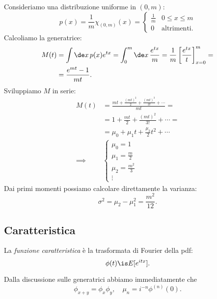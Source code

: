 \begin{example}
	Consideriamo una distribuzione uniforme in $(0,m)$:
	\begin{equation*}
		p(x) = \frac1m \chi_{(0,m)}(x) = \begin{cases}
			\frac 1m & 0 \le x \le m \\
			0  & \text{altrimenti.}
		\end{cases}
	\end{equation*}
	Calcoliamo la generatrice:
	\begin{align*}
		M(t) &= 
		\int \de x\, p(x) e^{tx} =
		\int_0^m \de x\, \frac{e^{tx}}{m} =
		\frac 1m \left[ \frac{e^{tx}}{t} \right]_{x=0}^m = \\
		&= \frac{e^{mt} - 1}{mt}.
	\end{align*}
	Sviluppiamo $M$ in serie:
	\begin{align*}
		M(t) &=
		\frac{mt + \frac{(mt)^2}2 + \frac{(mt)^3}{3!} + \dotsb}{mt} = \\
		&= 1 + \frac{mt}2 + \frac{(mt)^2}{3!} + \dotsb = \\
		&= \mu_0 + \mu_1t + \frac{\mu_2}2t^2 + \dotsb  \\
		\implies &\begin{cases}
			\mu_0 = 1 \\
			\mu_1 = \frac m2 \\
			\mu_2 = \frac{m^2}3 \\
			\vdots
		\end{cases}
	\end{align*}
	Dai primi momenti possiamo calcolare direttamente la varianza:
	\begin{equation*}
		\sigma^2 = \mu_2 - \mu_1^2 = \frac{m^2}{12}.
	\end{equation*}
\end{example}

\subsection{Caratteristica}

\begin{definition}
	La \emph{funzione caratteristica} è la trasformata di Fourier della pdf:
	\begin{equation*}
		\phi(t) \is E[e^{itx}].
	\end{equation*}
\end{definition}
Dalla discussione sulle generatrici abbiamo immediatamente che
\begin{equation*}
	\phi_{x+y} = \phi_x\phi_y, \quad \mu_n = i^{-n} \phi^{(n)}(0).
\end{equation*}

